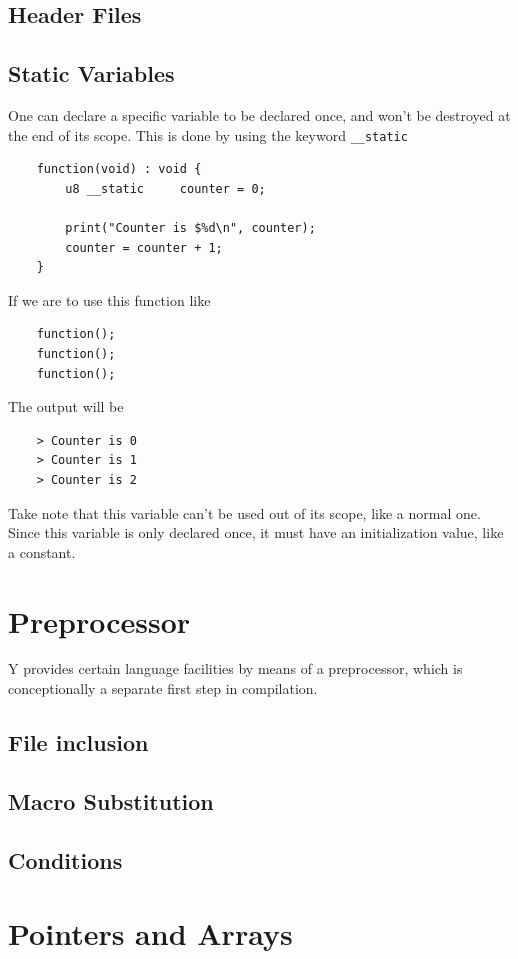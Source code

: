 \documentclass{scrartcl}
\begin{document}
        \subsection{Header Files}
        \subsection{Static Variables}
            One can declare a specific variable to be declared once, and won't
            be destroyed at the end of its scope. This is done by using the
            keyword \texttt{\_\_static}
            \begin{lstlisting}
    function(void) : void {
        u8 __static     counter = 0;

        print("Counter is $%d\n", counter);
        counter = counter + 1;
    }
            \end{lstlisting}
            If we are to use this function like
            \begin{lstlisting}
    function();
    function();
    function();
            \end{lstlisting}
            The output will be
            \begin{lstlisting}
    > Counter is 0
    > Counter is 1
    > Counter is 2
            \end{lstlisting}
            Take note that this variable can't be used out of its scope, like
            a normal one. Since this variable is only declared once, it must have
            an initialization value, like a constant.
    \section{Preprocessor}
        Y provides certain language facilities by means of a preprocessor, which
        is conceptionally a separate first step in compilation.
        \subsection{File inclusion}
        \subsection{Macro Substitution}
        \subsection{Conditions}
    \section{Pointers and Arrays}
\end{document}

